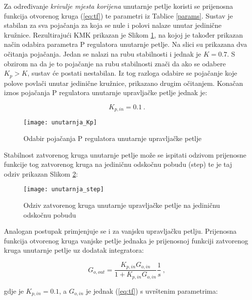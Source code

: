 \documentclass[11pt,a4paper]{article}
\begin{document}
\medskip

Za određivanje \textit{krivulje mjesta korijena} unutarnje petlje koristi se prijenosna funkcija otvorenog kruga (\ref{eq:tf}) te parametri iz Tablice \ref{params}. Sustav je stabilan za sva pojačanja za koja se nule i polovi nalaze unutar jedinične kružnice.  Rezultirajući KMK prikazan je Slikom \ref{fig:unutarnja_Kp}, na kojoj je također prikazan način odabira parametra P regulatora unutarnje petlje. Na slici su prikazana dva očitanja pojačanja. Jedan se nalazi na rubu stabilnosti i jednak je $K= 0.7$. S obzirom na da je to pojačanje na rubu stabilnosti znači da ako se odabere $K_{p} > K$, sustav će postati nestabilan. Iz tog razloga odabire se pojačanje koje polove povlači unutar jedinične kružnice, prikazano drugim očitanjem. Konačan iznos pojačanja P regulatora unutarnje upravljačke petlje jednak je:

 \begin{equation}
 \boxed{
 K_{p,in} = 0.1
 } \ .
 \label{eq:Kp_in}
 \end{equation}


\begin{figure}[H]
	\centering
	\texttt{[image: unutarnja\_Kp]}
	\caption{Odabir pojačanja P regulatora unutarnje upravljačke petlje}
	\label{fig:unutarnja_Kp}
\end{figure}

Stabilnost zatvorenog kruga unutarnje petlje može se ispitati odzivom prijenosne funkcije tog zatvorenog kruga na jediničnu odskočnu pobudu (step) te je taj odziv prikazan Slikom \ref{fig:step1}:

\begin{figure}[H]
	\centering
	\texttt{[image: unutarnja\_step]}
	\caption{Odziv zatvorenog kruga unutarnje upravljačke petlje na jediničnu odskočnu pobudu}
	\label{fig:step1}
\end{figure}


Analogan postupak primjenjuje se i za vanjsku upravljačku petlju. Prijenosna funkcija otvorenog kruga vanjske petlje jednaka je prijenosnoj funkciji zatvorenog kruga unutarnje petlje uz dodatak integratora:

\begin{equation}
G_{o,out} = \frac{K_{p,in}G_{o,in}}{1 + K_{p,in}G_{o,in}} \frac{1}{s}\ ,
\label{eq:tf2}
\end{equation}

gdje je $K_{p,in} = 0.1$, a $G_{o,in}$  je jednak (\ref{eq:tf}) s uvrštenim parametrima:
\end{document}
